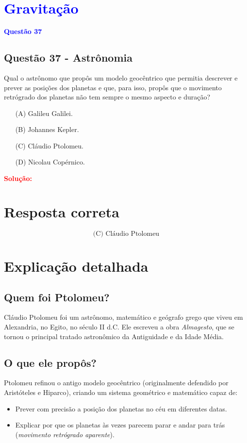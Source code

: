 \section{\large \textcolor{blue}{Gravitação}}

\begin{flushleft}
\textbf{\textcolor{blue}{\Large Quest\~ao 37}}\\
\noindent
\subsection{Quest\~ao 37 - Astrônomia}
\colorbox{green!30}{Qual o astrônomo que propôs um modelo geocêntrico que
permitia descrever e prever} \colorbox{green!30}{as posições dos planetas e que, para isso, propôs que o movimento retrógrado dos planetas}
não tem sempre o mesmo aspecto e duração?

\begin{itemize}
\item[(A)] Galileu Galilei.
\item[(B)] Johannes Kepler.
\item[(C)] Cláudio Ptolomeu.
\item[(D)] Nicolau Copérnico.
\end{itemize}

\vspace{0.5cm}

\textcolor{red}{\textbf{Solução:}}\\

\section*{Resposta correta}

\[
\boxed{\text{(C) Cláudio Ptolomeu}}
\]

\section*{Explicação detalhada}

\subsection*{Quem foi Ptolomeu?}
Cláudio Ptolomeu foi um astrônomo, matemático e geógrafo grego que viveu em Alexandria, no Egito, no século II d.C. Ele escreveu a obra \textit{Almagesto}, que se tornou o principal tratado astronômico da Antiguidade e da Idade Média.

\subsection*{O que ele propôs?}
Ptolomeu refinou o antigo modelo geocêntrico (originalmente defendido por Aristóteles e Hiparco), criando um sistema geométrico e matemático capaz de:
\begin{itemize}
    \item Prever com precisão a posição dos planetas no céu em diferentes datas.
    \item Explicar por que os planetas às vezes parecem parar e andar para trás (\textit{movimento retrógrado aparente}).
\end{itemize}


\end{flushleft}
